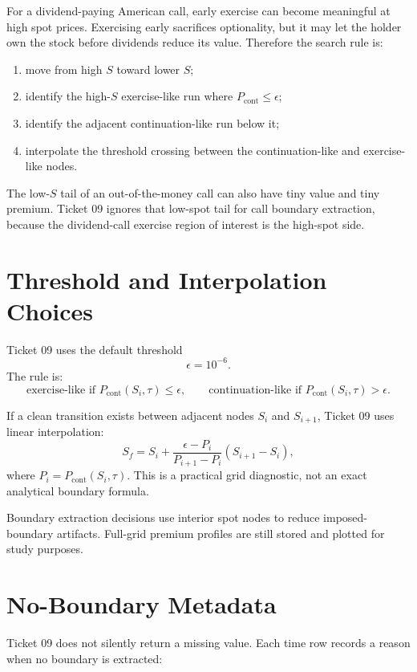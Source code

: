 \documentclass[11pt,a4paper]{article}
\begin{document}
For a dividend-paying American call, early exercise can become meaningful at high spot prices.
Exercising early sacrifices optionality, but it may let the holder own the stock before dividends
reduce its value. Therefore the search rule is:
\begin{enumerate}
  \item move from high \(S\) toward lower \(S\);
  \item identify the high-\(S\) exercise-like run where \(P_{\mathrm{cont}}\le\epsilon\);
  \item identify the adjacent continuation-like run below it;
  \item interpolate the threshold crossing between the continuation-like and exercise-like nodes.
\end{enumerate}

The low-\(S\) tail of an out-of-the-money call can also have tiny value and tiny premium. Ticket
09 ignores that low-spot tail for call boundary extraction, because the dividend-call exercise
region of interest is the high-spot side.

\section{Threshold and Interpolation Choices}

Ticket 09 uses the default threshold
\[
\epsilon = 10^{-6}.
\]
The rule is:
\[
\text{exercise-like if } P_{\mathrm{cont}}(S_i,\tau) \le \epsilon,\qquad
\text{continuation-like if } P_{\mathrm{cont}}(S_i,\tau) > \epsilon.
\]

If a clean transition exists between adjacent nodes \(S_i\) and \(S_{i+1}\), Ticket 09 uses
linear interpolation:
\[
S_f
= S_i
+ \frac{\epsilon - P_i}{P_{i+1}-P_i}
\left(S_{i+1}-S_i\right),
\]
where \(P_i=P_{\mathrm{cont}}(S_i,\tau)\). This is a practical grid diagnostic, not an exact
analytical boundary formula.

Boundary extraction decisions use interior spot nodes to reduce imposed-boundary artifacts.
Full-grid premium profiles are still stored and plotted for study purposes.

\section{No-Boundary Metadata}

Ticket 09 does not silently return a missing value. Each time row records a reason when no
boundary is extracted:
\end{document}
